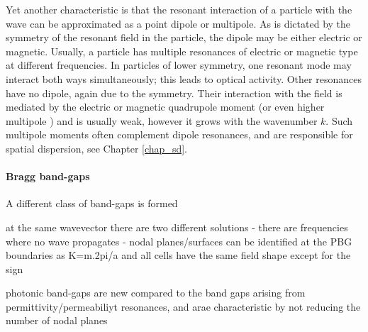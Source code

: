 Yet another characteristic is that the resonant interaction of a particle with the wave can be approximated as a point dipole or multipole. As is dictated by the symmetry of the resonant field in the particle, the dipole may be either electric or magnetic. Usually, a particle has multiple resonances of electric or magnetic type at different frequencies. In particles of lower symmetry, one resonant mode may interact both ways simultaneously; this leads to optical activity. 
Other resonances have no dipole, again due to the symmetry. Their interaction with the field is mediated by the electric or magnetic quadrupole moment (or even higher multipole \cite{merlin2009metamaterials}) and is usually weak, however it grows with the wavenumber $k$. Such multipole moments often complement dipole resonances, and are responsible for spatial dispersion, see Chapter \ref{chap_sd}. %

\paragraph{Bragg band-gaps}%
A different class of band-gaps is formed 





at the same wavevector there are two different solutions - there are frequencies where no wave propagates - nodal planes/surfaces can be identified at the PBG boundaries as K=m.2pi/a and all cells have the same field shape except for the sign

photonic band-gaps are new compared to the band gaps arising from permittivity/permeabiliyt resonances, and arae characteristic by not reducing the number of nodal planes 


